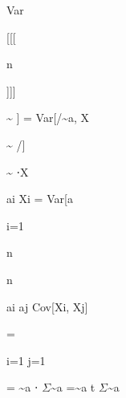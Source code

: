 \documentclass[a4paper,portrait,12pt]{article}
\begin{document}
\begin{flushleft}
Var
\end{flushleft}





[[[





\begin{flushleft}
n
\end{flushleft}





]]]





\begin{flushleft}
\~{} ] = Var[/\~{}a, X
\end{flushleft}


\~{} /]


\begin{flushleft}
\~{} ⋅X
\end{flushleft}


\begin{flushleft}
ai Xi = Var[a
\end{flushleft}


\begin{flushleft}
i=1
\end{flushleft}





\begin{flushleft}
n
\end{flushleft}





\begin{flushleft}
n
\end{flushleft}





\begin{flushleft}
ai aj Cov[Xi, Xj]
\end{flushleft}





=


\begin{flushleft}
i=1 j=1
\end{flushleft}





\begin{flushleft}
= \~{}a ⋅ $\Sigma$\~{}a =\~{}a t $\Sigma$\~{}a
\end{flushleft}
\end{document}
